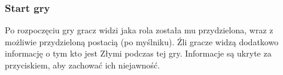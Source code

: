 \documentclass[12pt]{article}
\begin{document}
\subsubsection{Start gry}
\begin{figure}[!htb]
    \centering
    \centering
\end{figure}
Po rozpoczęciu gry gracz widzi jaka rola została mu przydzielona, wraz z możliwie przydzieloną postacią (po myślniku). Źli gracze widzą dodatkowo informację o tym kto jest Złymi podczas tej gry. Informacje są ukryte za przyciskiem, aby zachować ich niejawność.
\end{document}
